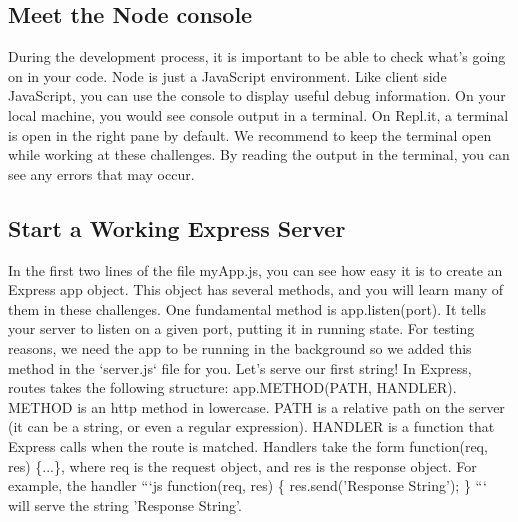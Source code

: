 \documentclass{article}%
\begin{document}
\subsection{Meet the Node console}%
\label{subsec:MeettheNodeconsole}%
During the development process, it is important to be able to check what’s going on in your code. \newline%
Node is just a JavaScript environment. Like client side JavaScript, you can use the console to display useful debug information. On your local machine, you would see console output in a terminal. On Repl.it, a terminal is open in the right pane by default.\newline%
We recommend to keep the terminal open while working at these challenges. By reading the output in the terminal, you can see any errors that may occur.\newline%

%
\subsection{Start a Working Express Server}%
\label{subsec:StartaWorkingExpressServer}%
In the first two lines of the file myApp.js, you can see how easy it is to create an Express app object. This object has several methods, and you will learn many of them in these challenges. One fundamental method is app.listen(port). It tells your server to listen on a given port, putting it in running state. For testing reasons, we need the app to be running in the background so we added this method in the `server.js` file for you.\newline%
Let’s serve our first string! In Express, routes takes the following structure: app.METHOD(PATH, HANDLER). METHOD is an http method in lowercase. PATH is a relative path on the server (it can be a string, or even a regular expression). HANDLER is a function that Express calls when the route is matched.\newline%
Handlers take the form function(req, res) \{...\}, where req is the request object, and res is the response object. For example, the handler\newline%
```js\newline%
function(req, res) \{\newline%
  res.send('Response String');\newline%
\}\newline%
```\newline%
will serve the string 'Response String'.\newline%
\end{document}
